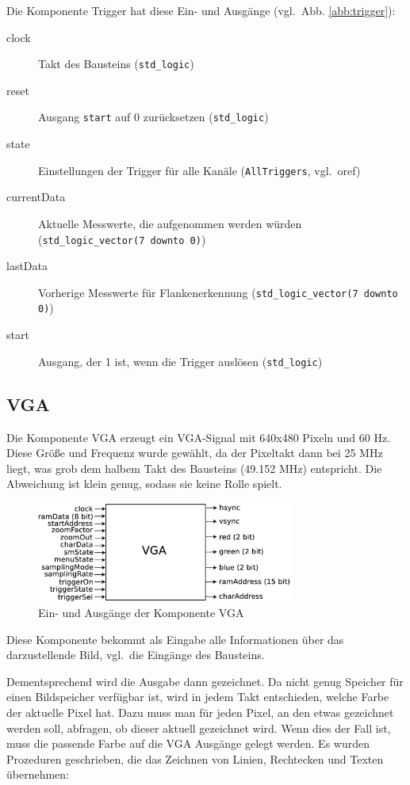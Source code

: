 \documentclass[IN,ngerman,utf8,12pt]{tumbook}
\newcommand{\vgl}{vgl.\ }
\begin{document}
Die Komponente Trigger hat diese Ein- und Ausgänge (\vgl Abb. \ref{abb:trigger}):

\begin{description}
    \item[clock] Takt des Bausteins (\texttt{std\_logic})
    \item[reset] Ausgang \texttt{start} auf 0 zurücksetzen (\texttt{std\_logic})
    \item[state] Einstellungen der Trigger für alle Kanäle (\texttt{AllTriggers}, \vgl o{ref})
    \item[currentData] Aktuelle Messwerte, die aufgenommen werden würden (\texttt{std\_logic\_vector(7 downto 0)})
    \item[lastData] Vorherige Messwerte für Flankenerkennung (\texttt{std\_logic\_vector(7 downto 0)})
    \item[start] Ausgang, der 1 ist, wenn die Trigger auslösen (\texttt{std\_logic})
\end{description}

\subsection{VGA}

Die Komponente VGA erzeugt ein VGA-Signal mit 640x480 Pixeln und 60 Hz.
Diese Größe und Frequenz wurde gewählt, da der Pixeltakt dann bei 25 MHz liegt, was grob dem halbem Takt des Bausteins (49.152 MHz) entspricht.
Die Abweichung ist klein genug, sodass sie keine Rolle spielt.

\begin{figure}[H]
    \centerline{
        \includegraphics[width=0.75\textwidth]{img/vga}
    }
    \label{abb:vga}
    \caption{Ein- und Ausgänge der Komponente VGA}
\end{figure}

Diese Komponente bekommt als Eingabe alle Informationen über das darzustellende Bild, \vgl die Eingänge des Bausteins.

Dementsprechend wird die Ausgabe dann gezeichnet.
Da nicht genug Speicher für einen Bildspeicher verfügbar ist, wird in jedem Takt entschieden, welche Farbe der aktuelle Pixel hat.
Dazu muss man für jeden Pixel, an den etwas gezeichnet werden soll, abfragen, ob dieser aktuell gezeichnet wird.
Wenn dies der Fall ist, muss die passende Farbe auf die VGA Ausgänge gelegt werden.
Es wurden Prozeduren geschrieben, die das Zeichnen von Linien, Rechtecken und Texten übernehmen:
\end{document}
